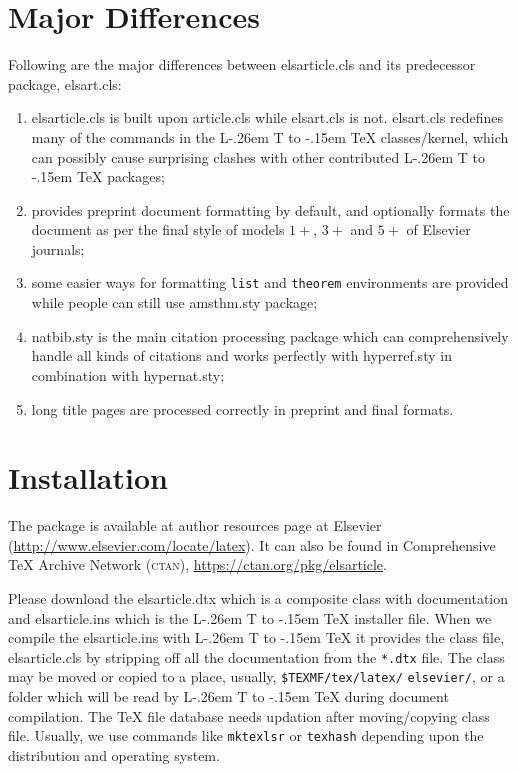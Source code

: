 \documentclass[a4paper,12pt]{article}
\makeatletter
\def\file#1{\textsf{#1}\xspace}
\DeclareRobustCommand{\LaTeX}{L\kern-.26em%
        {\sbox\z@ T%
         \vbox to\ht\z@{\hbox{\check@mathfonts
           \fontsize\sf@size\z@
           \math@fontsfalse\selectfont
          A\,}%
         \vss}%
        }%
     \kern-.15em%
    \TeX}
\makeatother
\begin{document}
\section{Major Differences}

Following are the major differences between \file{elsarticle.cls}
and its predecessor package, \file{elsart.cls}:

\begin{enumerate}[\textbullet]
\item \file{elsarticle.cls} is built upon \file{article.cls}
while \file{elsart.cls} is not. \file{elsart.cls} redefines
many of the commands in the \LaTeX{} classes/kernel, which can
possibly cause surprising clashes with other contributed
\LaTeX{} packages;

\item provides preprint document formatting by default, and
optionally formats the document as per the final
style of models $1+$, $3+$ and $5+$ of Elsevier journals;

\item some easier ways for formatting \verb+list+ and
\verb+theorem+ environments are provided while people can still
use \file{amsthm.sty} package;

\item \file{natbib.sty} is the main citation processing package
  which can comprehensively handle all kinds of citations and
works perfectly with \file{hyperref.sty} in combination with
\file{hypernat.sty};

\item long title pages are processed correctly in preprint and
  final formats.

\end{enumerate}

\section{Installation}

The package is available at author resources page at Elsevier
(\url{http://www.elsevier.com/locate/latex}).
It can also be found in Comprehensive
\TeX{} Archive Network (\textsc{ctan}),
\url{https://ctan.org/pkg/elsarticle}.

Please download the \file{elsarticle.dtx} which is a composite
class with documentation and \file{elsarticle.ins} which is the
\LaTeX{} installer file. When we compile the
\file{elsarticle.ins} with \LaTeX{} it provides the class file,
\file{elsarticle.cls} by
stripping off all the documentation from the \verb+*.dtx+ file.
The class may be moved or copied to a place, usually,
\verb+$TEXMF/tex/latex/+ %
\verb+elsevier/+,
or a folder which will be read
by \LaTeX{} during document compilation.  The \TeX{} file
database needs updation after moving/copying class file.  Usually,
we use commands like \verb+mktexlsr+ or \verb+texhash+ depending
upon the distribution and operating system.
\end{document}
